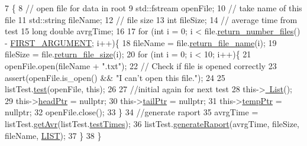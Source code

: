 \begin{DoxyCode}
7                                                \{
8     \textcolor{comment}{// open file for data in root}
9     std::fstream openFile;
10     \textcolor{comment}{// take name of this file}
11     std::string fileName;
12     \textcolor{comment}{// file size}
13     \textcolor{keywordtype}{int} fileSize;
14     \textcolor{comment}{// average time from test}
15     \textcolor{keywordtype}{long} \textcolor{keywordtype}{double} avrgTime;
16 
17     \textcolor{keywordflow}{for} (\textcolor{keywordtype}{int} i = 0; i < file.\hyperlink{class_input_files_a3db5accd81913e0b89fdd3b4650c8923}{return\_number\_files}() - 
      \hyperlink{inputfile__txt_8h_ac6795aca310766e1b10d90013aac6d47}{FIRST\_ARGUMENT}; i++)\{
18         fileName = file.\hyperlink{class_input_files_a9246bc217efcfa1569478bcf44e1cd20}{return\_file\_name}(i);
19         fileSize = file.\hyperlink{class_input_files_a9c65bfcc0e684642c40c999959d6d014}{return\_file\_size}(i);
20         \textcolor{keywordflow}{for} (\textcolor{keywordtype}{int} i = 0; i < 10; i++)\{
21             openFile.open(fileName + \textcolor{stringliteral}{".txt"});
22             \textcolor{comment}{// Check if file is opened correctly}
23             assert(openFile.is\_open() && \textcolor{stringliteral}{"I can't open this file."});
24 
25             listTest.\hyperlink{class_benchmark_a4107fff4e0da31d561fc6109e359b341}{test}(openFile, \textcolor{keyword}{this});
26 
27             \textcolor{comment}{//initial again for next test}
28             this->\hyperlink{class_list_a70aecf37bd9d779a394e4d50377fbf5f}{~List}();
29             this->\hyperlink{class_list_a5610353d95d627beab38b7366921e0c3}{headPtr} = \textcolor{keyword}{nullptr};
30             this->\hyperlink{class_list_a73c6ff858ccd116181acc4795bd1ed58}{tailPtr} = \textcolor{keyword}{nullptr};
31             this->\hyperlink{class_list_a9a3a51357cab8c53233ba00b8545eb5a}{tempPtr} = \textcolor{keyword}{nullptr};
32             openFile.close();
33         \}
34         \textcolor{comment}{//generate raport}
35         avrgTime = listTest.\hyperlink{class_benchmark_a3efa1ec3d4e76eb0fa1633dda265c711}{getAvr}(listTest.\hyperlink{class_benchmark_a5563f218941d6b01ac7783f1e6582025}{testTimes});
36         listTest.\hyperlink{class_benchmark_abf697c20cfadd6d084cd32bc2c9f6c9f}{generateRaport}(avrgTime, fileSize, fileName, \hyperlink{benchmark__frm_8h_ac2ad7f431e3446fddcd9b6b9f93c4c14a25688e799536738ea469158ef15fd1c0}{LIST});
37     \}
38 \}
\end{DoxyCode}
\hypertarget{class_list_a70aecf37bd9d779a394e4d50377fbf5f}{}
